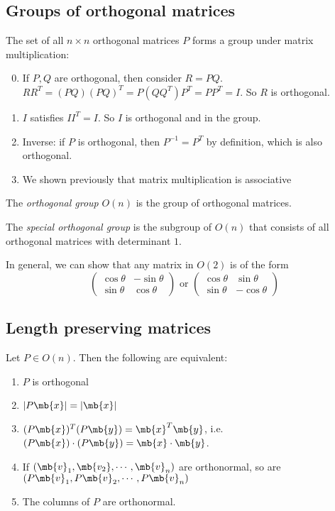 \documentclass[a4paper]{article}
\begin{document}
\subsection{Groups of orthogonal matrices}
\begin{prop}
  The set of all $n\times n$ orthogonal matrices $P$ forms a group under matrix multiplication:
  \begin{enumerate}[label=\arabic{*}.]
    \setcounter{enumi}{-1}
  \item If $P, Q$ are orthogonal, then consider $R = PQ$. $RR^T = (PQ)(PQ)^T = P(QQ^T)P^T = PP^T = I$. So $R$ is orthogonal.
  \item $I$ satisfies $II^T = I$. So $I$ is orthogonal and in the group.
  \item Inverse: if $P$ is orthogonal, then $P^{-1}=P^T$ by definition, which is also orthogonal.
  \item We shown previously that matrix multiplication is associative
  \end{enumerate}
\end{prop}

\begin{defi}
  The \emph{orthogonal group} $O(n)$ is the group of orthogonal matrices.
\end{defi}

\begin{defi}
  The \emph{special orthogonal group} is the subgroup of $O(n)$ that consists of all orthogonal matrices with determinant $1$.
\end{defi}

In general, we can show that any matrix in $O(2)$ is of the form
\[
\begin{pmatrix}
  \cos\theta & -\sin\theta\\
  \sin\theta & \cos\theta
\end{pmatrix}\text{ or }
\begin{pmatrix}
  \cos\theta & \sin\theta\\
  \sin\theta & -\cos\theta
\end{pmatrix}
\]
\subsection{Length preserving matrices}
\begin{thm}
  Let $P\in O(n)$. Then the following are equivalent:
  \begin{enumerate}
    \item $P$ is orthogonal
    \item $|P\mb{x}| = |\mb{x}|$
    \item $(P\mb{x})^T(P\mb{y}) = \mb{x}^T\mb{y}$, i.e. $(P\mb{x})\cdot(P\mb{y}) = \mb{x}\cdot \mb{y}$.
    \item If $(\mb{v}_1, \mb{v_2}, \cdots, \mb{v}_n)$ are orthonormal, so are $(P\mb{v}_1, P\mb{v}_2, \cdots, P\mb{v}_n)$
    \item The columns of $P$ are orthonormal. 
  \end{enumerate}
\end{thm}
\end{document}
